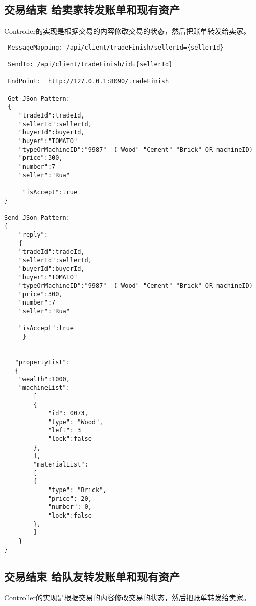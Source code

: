 \documentclass{article}
\begin{document}
				\subsection{交易结束 给卖家转发账单和现有资产}

                Controller的实现是根据交易的内容修改交易的状态，然后把账单转发给卖家。

\begin{lstlisting}
 MessageMapping: /api/client/tradeFinish/sellerId={sellerId}

 SendTo: /api/client/tradeFinish/id={sellerId}

 EndPoint:  http://127.0.0.1:8090/tradeFinish

 Get JSon Pattern:
 {
    "tradeId":tradeId,
    "sellerId":sellerId,
    "buyerId":buyerId,
    "buyer":"TOMATO"
    "typeOrMachineID":"9987"  ("Wood" "Cement" "Brick" OR machineID)
    "price":300,
    "number":7
    "seller":"Rua"

     "isAccept":true
}

Send JSon Pattern:
{
    "reply":
    {
    "tradeId":tradeId,
    "sellerId":sellerId,
    "buyerId":buyerId,
    "buyer":"TOMATO"
    "typeOrMachineID":"9987"  ("Wood" "Cement" "Brick" OR machineID)
    "price":300,
    "number":7
    "seller":"Rua"

    "isAccept":true
     }


   "propertyList":
   {
   	"wealth":1000,
   	"machineList":
    	[
        {
            "id": 0073,
            "type": "Wood",
            "left": 3
            "lock":false
        },
        ],
    	"materialList":
    	[
        {
            "type": "Brick",
            "price": 20,
            "number": 0,
            "lock":false
        },
    	]
    }
}
\end{lstlisting}

				\subsection{交易结束 给队友转发账单和现有资产}

                Controller的实现是根据交易的内容修改交易的状态，然后把账单转发给卖家。
\end{document}
